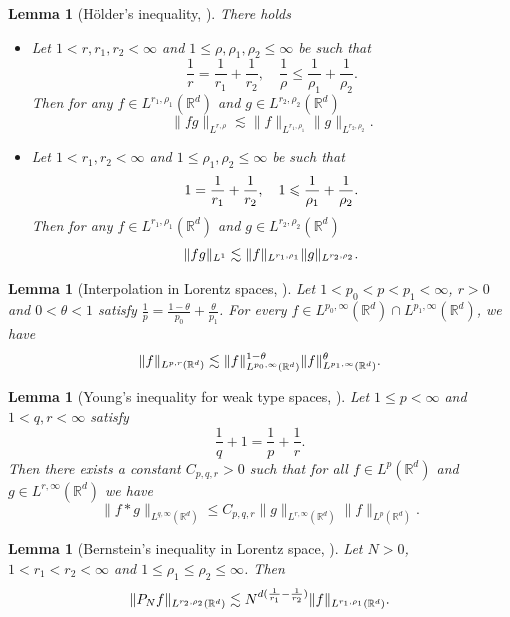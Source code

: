 \documentclass[reqno,11pt]{amsart}
\theoremstyle{plain}
\newtheorem{lemma}[theorem]{Lemma}
\theoremstyle{definition}
\numberwithin{equation}{section}
\numberwithin{theorem}{section}
\def\le{\leqslant}
\def\leq{\leqslant}
\def\R{\mathbb{R}}
\begin{document}
\begin{lemma}[H\"older's inequality, \cite{ONeil}]  There holds
\begin{itemize}
\item[$(i)$]  Let $1<r, r_1, r_2<\infty$ and $1\leq \rho, \rho_1, \rho_2 \leq \infty$ be such that
\[\frac{1}{r}=\frac{1}{r_1}+\frac{1}{r_2}, \quad \frac{1}{\rho} \leq \frac{1}{\rho_1}+\frac{1}{\rho_2}.
		\]
Then for any $f \in L^{r_1, \rho_1}(\mathbb{R}^d)$ and $g\in L^{r_2, \rho_2}(\mathbb{R}^d)$
\[\|fg\|_{L^{r,\rho}} \lesssim \|f\|_{L^{r_1, \rho_1}} \|g\|_{L^{r_2,\rho_2}}.\]
\item[$(ii)$] Let  $1<r_1,r_2<\infty $ and  $1\le \rho_1,\rho_2\le \infty $  be such that 
\begin{equation}
1=\frac{1}{r_1}+\frac{1}{r_2},\quad 1\le \frac{1}{\rho_1}+\frac{1}{\rho_2}.\notag
\end{equation}
Then  for any $f \in L^{r_1, \rho_1}(\mathbb{R}^d)$ and $g\in L^{r_2, \rho_2}(\mathbb{R}^d)$
\begin{equation}
\|fg\|_{L^1}\lesssim  \|f\|_{L^{r_1, \rho_1}} \|g\|_{L^{r_2,\rho_2}}.\notag
\end{equation}
\end{itemize}
\end{lemma}
\begin{lemma}[{Interpolation in Lorentz spaces}, \cite{Dao}]\label{CZ}
Let  $1<p_0<p<p_1<\infty $,  $r>0$ and $0<\theta<1$ satisfy  $\frac{1}{p}=\frac{1-\theta}{p_0}+\frac{\theta}{p_1}$. For every  $f\in L^{p_0,\infty }(\mathbb{R}^d)\cap L^{p_1,\infty }(\mathbb{R}^d)$, we have
	\begin{equation}
		\|f\|_{L^{p,r}(\mathbb{R} ^d)}\lesssim  \|f\|_{L^{p_0,\infty }(\mathbb{R} ^d)}^{1-\theta} \|f\|_{L^{p_1,\infty }(\mathbb{R} ^d)}^{\theta}.\notag
	\end{equation}
\end{lemma}
\begin{lemma}[Young's inequality for weak type spaces, \cite{Grafakos}]\label{lem:weakYoung}
Let $1 \leq p < \infty$ and $1 < q, r < \infty$ satisfy
\[\frac{1}{q} + 1 = \frac{1}{p} + \frac{1}{r}.\]
Then there exists a constant $C_{p,q,r} > 0$  such that for all $f \in L^p(\R^d)$  and $g \in L^{r,\infty}(\R^d)$  we have
\[\|f*g\|_{L^{q,\infty}(\R^d)} \leq C_{p,q,r}\|g\|_{L^{r,\infty}(\R^d)}\|f\|_{L^p(\R^d)}.
\]
\end{lemma}

\begin{lemma}[Bernstein's inequality in Lorentz space, \cite{LMZ}]\label{L:Bernstein}
Let  $N>0$,  $1<r_1<r_2<\infty $ and  $1\le \rho_1\le\rho_2\le \infty $. Then 
\begin{equation}
\|P_{N}f\|_{L^{r_2,\rho_2}(\mathbb{R} ^d)}\lesssim  N^{d(\frac{1}{r_1}-\frac{1}{r_2})} \|f\|_{L^{r_1,\rho_1}(\mathbb{R} ^d)}.\notag  
\end{equation}
\end{lemma}
\end{document}
